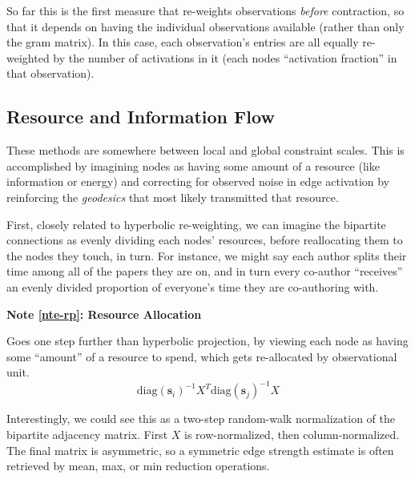 \documentclass[%
	12pt,
		oneside,
		letterpaper
]{book}
\newcounter{quartocalloutnteno}
\newcommand{\quartocalloutnte}[1]{\refstepcounter{quartocalloutnteno}\label{#1}}
\begin{document}
So far this is the first measure that re-weights observations \emph{before} contraction, so that it depends on having the individual observations available (rather than only the gram matrix).
In this case, each observation's entries are all equally re-weighted by the number of activations in it (each nodes ``activation fraction'' in that observation).

\subsection{Resource and Information Flow}\label{resource-and-information-flow}

These methods are somewhere between local and global constraint scales.
This is accomplished by imagining nodes as having some amount of a resource (like information or energy) and correcting for observed noise in edge activation by reinforcing the \emph{geodesics} that most likely transmitted that resource.

First, closely related to hyperbolic re-weighting, we can imagine the bipartite connections as evenly dividing each nodes' resources, before reallocating them to the nodes they touch, in turn.
For instance, we might say each author splits their time among all of the papers they are on, and in turn every co-author ``receives'' an evenly divided proportion of everyone's time they are co-authoring with.

\begin{tcolorbox}[enhanced jigsaw, toprule=.15mm, left=2mm, leftrule=.75mm, rightrule=.15mm, colframe=quarto-callout-note-color-frame, arc=.35mm, colback=white, opacityback=0, bottomrule=.15mm, breakable]

\quartocalloutnte{nte-rp} 

\vspace{-3mm}\textbf{Note \ref*{nte-rp}: Resource Allocation}\vspace{3mm}

Goes one step further than hyperbolic projection, by viewing each node as having some ``amount'' of a resource to spend, which gets re-allocated by observational unit. \autocite{Bipartitenetworkprojection_Zhou2007}
\[ \text{diag}(\mathbf{s}_i)^{-1}X^T\text{diag}(\mathbf{s}_j)^{-1}X \]

\end{tcolorbox}

Interestingly, we could see this as a two-step random-walk normalization of the bipartite adjacency matrix.
First \(X\) is row-normalized, then column-normalized.
The final matrix is asymmetric, so a symmetric edge strength estimate is often retrieved by mean, max, or min reduction operations.
\end{document}

